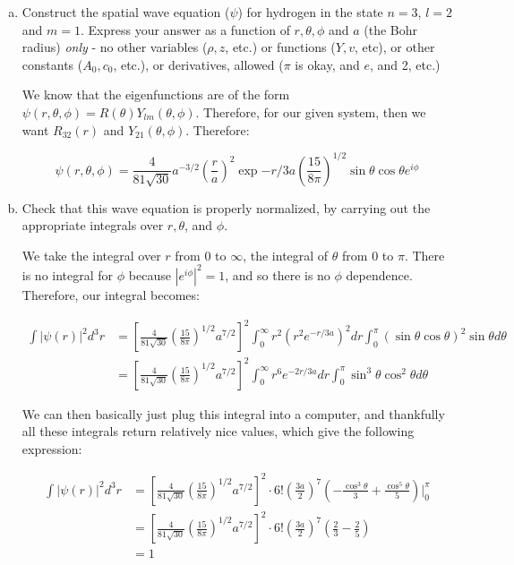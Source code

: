 \documentclass[10pt]{article}
\begin{document}
    \begin{enumerate}[(a)]
        \item Construct the spatial wave equation ($\psi$) for hydrogen in the state $n = 3$, $l = 2$ and $m = 1$. Express your answer as a function of $r, \theta, \phi$ and $a$ (the Bohr radius) \textit{only} - no other variables ($\rho, z$, etc.) or functions ($Y, v$, etc), or other constants ($A_0, c_0$, etc.), or derivatives, allowed ($\pi$ is okay, and $e$, and 2, etc.)
        
        \begin{solution}
            We know that the eigenfunctions are of the form $\psi(r, \theta, \phi) = R(\theta) Y_{lm}(\theta, \phi)$. Therefore, for our given system, then we want $R_{32}(r)$ and $Y_{21}(\theta, \phi)$. Therefore: 

            \[ \psi(r, \theta, \phi) = \frac{4}{81 \sqrt{30}}a^{-3/2} \left(\frac ra\right)^2 \exp{-r/3a} \left(\frac{15}{8\pi}\right)^{1/2} \sin \theta \cos \theta e^{i\phi}\]
        \end{solution}
        
        \item Check that this wave equation is properly normalized, by carrying out the appropriate integrals over $r, \theta$, and $\phi$. 
        
        \begin{solution}
            We take the integral over $r$ from $0$ to $\infty$, the integral of $\theta$ from $0$ to $\pi$. There is no integral for $\phi$ because $|e^{i \phi}|^2 = 1$, and so there is no $\phi$ dependence. Therefore, our integral becomes: 


            \begin{align*}
                \int |\psi(r)|^2 d^3r &= \left[\frac{4}{81\sqrt{30}}\left(\frac{15}{8\pi}\right)^{1/2}a^{7/2}\right]^2 \int_0^\infty r^2 \left(r^2 e^{-r/3a}\right)^2 dr \int_0^\pi (\sin \theta \cos \theta)^2 \sin \theta d\theta\\
                &= \left[\frac{4}{81\sqrt{30}}\left(\frac{15}{8\pi}\right)^{1/2}a^{7/2}\right]^2 \int_0^\infty r^6 e^{-2r/3a} dr \int_0^\pi \sin^3 \theta \cos^2 \theta d \theta
            \end{align*}

            We can then basically just plug this integral into a computer, and thankfully all these integrals return relatively nice values, which give the following expression: 

            \begin{align*}
            \int |\psi(r)|^2 d^3r &= \left[\frac{4}{81\sqrt{30}}\left(\frac{15}{8\pi}\right)^{1/2}a^{7/2}\right]^2 \cdot 6! \left(\frac{3a}{2}\right)^7 \left(-\frac{\cos^3 \theta}{3} + \frac{\cos^5 \theta}{5}\right)\bigg|_0^\pi\\
            &= \left[\frac{4}{81\sqrt{30}}\left(\frac{15}{8\pi}\right)^{1/2}a^{7/2}\right]^2 \cdot 6! \left(\frac{3a}{2}\right)^7\left( \frac 23 - \frac 25 \right)\\
            &= 1
            \end{align*}


\end{solution}
\end{enumerate}
\end{document}
